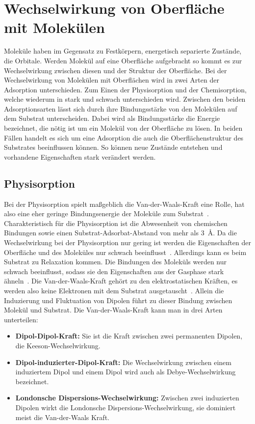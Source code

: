     
    \section{Wechselwirkung von Oberfläche mit Molekülen}
        Moleküle haben im Gegensatz zu Festkörpern, energetisch separierte Zustände, die Orbitale.
        Werden Molekül auf eine Oberfläche aufgebracht so kommt es zur Wechselwirkung zwischen diesen und der Struktur der Oberfläche.
        Bei der Wechselwirkung von Molekülen mit Oberflächen wird in zwei Arten der Adsorption unterschieden. 
        Zum Einen der Physisorption und der Chemisorption, welche wiederum in stark und schwach unterschieden wird.
        Zwischen den beiden Adsorptionsarten lässt sich durch ihre Bindungsstärke von den Molekülen auf dem Substrat unterscheiden.
        Dabei wird als Bindungsstärke die Energie bezeichnet, die nötig ist um ein Molekül von der Oberfläche zu lösen.
        In beiden Fällen handelt es sich um eine Adsorption die auch die Oberflächenstruktur des Substrates beeinflussen können.
        So können neue Zustände entstehen und vorhandene Eigenschaften stark verändert werden.
        
        \subsection{Physisorption}
            Bei der Physisorption spielt maßgeblich die Van-der-Waals-Kraft eine Rolle, hat also eine eher geringe Bindungsenergie der Moleküle zum Substrat~\cite{cinchetti_activating_2017}.
            Charakteristisch für die Physisorption ist die Abwesenheit von chemischen Bindungen sowie einen Substrat-Adsorbat-Abstand von mehr als \SI{3}{\angstrom}. %
            Da die Wechselwirkung bei der Physisorption nur gering ist werden die Eigenschaften der Oberfläche und des Moleküles nur schwach beeinflusst~\cite{bergenti_spinterface_2019}.
            Allerdings kann es beim Substrat zu Relaxation kommen.
            Die Bindungen des Moleküls werden nur schwach beeinflusst, sodass sie den Eigenschaften aus der Gasphase stark ähneln~\cite{cinchetti_activating_2017}.
            Die Van-der-Waals-Kraft gehört zu den elektrostatischen Kräften, es werden also keine Elektronen mit dem Substrat ausgetauscht~\cite{bergenti_spinterface_2019}.
            Allein die Induzierung und Fluktuation von Dipolen führt zu dieser Bindung zwischen Molekül und Substrat.
            Die Van-der-Waals-Kraft kann man in drei Arten unterteilen:
            \begin{itemize}
                \item \textbf{Dipol-Dipol-Kraft:} Sie ist die Kraft zwischen zwei permanenten Dipolen, die Keeson-Wechselwirkung.
                \item \textbf{Dipol-induzierter-Dipol-Kraft:} Die Wechselwirkung zwischen einem induziertem Dipol und einem Dipol wird auch als Debye-Wechselwirkung bezeichnet.
                \item \textbf{Londonsche Dispersions-Wechselwirkung:} Zwischen zwei induzierten Dipolen wirkt die Londonsche Dispersions-Wechselwirkung, sie dominiert meist die Van-der-Waals Kraft.
            \end{itemize}

